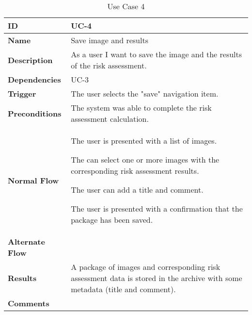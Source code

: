 \begin{table}[H]
    \begin{tabular}{ | >{\bfseries}l | p{9.5cm} |}
    \hline
    ID
    &  UC-4 \\ \hline
    Name
    & Save image and results \\ \hline
    Description
    &  As a user I want to save the image and the results of the risk assessment. \\ \hline
    Dependencies
    & UC-3 \\ \hline
    Trigger
    & The user selects the "save" navigation item. \\ \hline
    Preconditions
    & The system was able to complete the risk assessment calculation. \\ \hline
    Normal Flow
    &
    \begin{description}[align=left]
    \item [1.]The user is presented with a list of images.
    \item [2.]The can select one or more images with the corresponding risk assessment results.
    \item [3.]The user can add a title and comment.
    \item [4.]The user is presented with a confirmation that the package has been saved.
    \end{description}
    \\ \hline
    Alternate Flow
    &

    \\ \hline
    Results
    &
    A package of images and corresponding risk assessment data is stored in the archive with some metadata (title and comment).
    \\ \hline
    Comments
    &  \\ \hline
    \end{tabular}

    \caption{Use Case 4}
    \label{fig:uc_4}
\end{table}